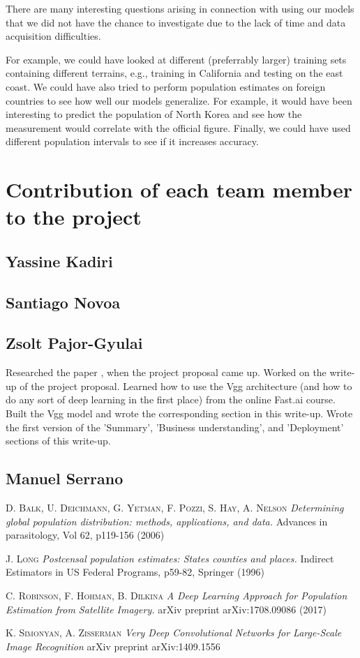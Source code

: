 \documentclass{article}
\begin{document}
There are many interesting questions arising in connection with using our models that we did not have the chance to investigate due to the lack of time and data acquisition difficulties.

For example, we could have looked at different (preferrably larger) training sets containing different terrains, e.g., training in California and testing on the east coast. We could have also tried to perform population estimates on foreign countries to see how well our models generalize. For example, it would have been interesting to predict the population of North Korea and see how the measurement would correlate with the official figure. Finally, we could have used different population intervals to see if it increases accuracy.

\appendix
\section{Contribution of each team member to the project}
\subsection{Yassine Kadiri}
\subsection{Santiago Novoa}
\subsection{Zsolt Pajor-Gyulai}
Researched the paper \cite{RHD17}, when the project proposal came up. Worked on the write-up of the project proposal. Learned how to use the Vgg architecture (and how to do any sort of deep learning in the first place) from the online Fast.ai course. Built the Vgg model and wrote the corresponding section in this write-up. Wrote the first version of the 'Summary', 'Business understanding', and 'Deployment' sections of this write-up.
\subsection{Manuel Serrano}

\begin{thebibliography}{9}

 \textsc{D. Balk, U. Deichmann, G. Yetman, F. Pozzi, S. Hay, A. Nelson} \textit{ Determining global population distribution: methods, applications, and data.} Advances in parasitology, Vol 62, p119-156 (2006)

 \textsc{J. Long}\textit{ Postcensal population estimates: States counties and places.} Indirect Estimators in US Federal Programs, p59-82, Springer (1996)

  \textsc{C. Robinson, F. Hohman, B. Dilkina}\textit{ A Deep Learning Approach for Population Estimation from Satellite Imagery.} arXiv preprint arXiv:1708.09086 (2017)

 \textsc{K. Simonyan, A. Zisserman} \textit{ Very Deep Convolutional Networks for Large-Scale Image Recognition} arXiv preprint arXiv:1409.1556
\end{thebibliography}
\end{document}
